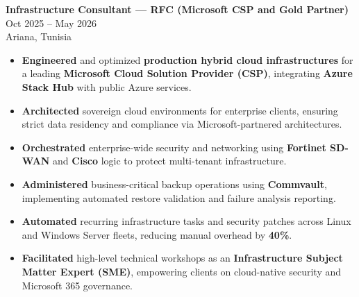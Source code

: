 \documentclass[10pt, letterpaper]{article}
\newenvironment{highlights}{
\begin{itemize}[leftmargin=12pt, itemsep=2pt]
}{
\end{itemize}
}
\begin{document}
\textbf{Infrastructure Consultant --- RFC (Microsoft CSP and Gold Partner)} \hfill Oct 2025 -- May 2026 \\
Ariana, Tunisia
\begin{highlights}
\item \textbf{Engineered} and optimized \textbf{production hybrid cloud infrastructures} for a leading \textbf{Microsoft Cloud Solution Provider (CSP)}, integrating \textbf{Azure Stack Hub} with public Azure services.
\item \textbf{Architected} sovereign cloud environments for enterprise clients, ensuring strict data residency and compliance via Microsoft-partnered architectures.
\item \textbf{Orchestrated} enterprise-wide security and networking using \textbf{Fortinet SD-WAN} and \textbf{Cisco} logic to protect multi-tenant infrastructure.
\item \textbf{Administered} business-critical backup operations using \textbf{Commvault}, implementing automated restore validation and failure analysis reporting.
\item \textbf{Automated} recurring infrastructure tasks and security patches across Linux and Windows Server fleets, reducing manual overhead by \textbf{40\%}.
\item \textbf{Facilitated} high-level technical workshops as an \textbf{Infrastructure Subject Matter Expert (SME)}, empowering clients on cloud-native security and Microsoft 365 governance.
\end{highlights}
\end{document}
